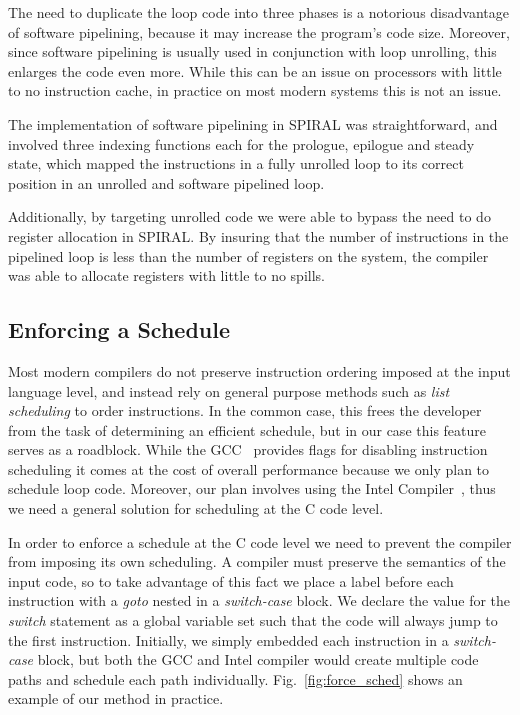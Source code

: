 \documentclass[10pt]{article}
\begin{document}
The need to duplicate the loop code into three phases is a notorious disadvantage of software
pipelining, because it may increase the program's code size. Moreover, since software pipelining
is usually used in conjunction with loop unrolling, this enlarges the code
even more. While this can be an issue on processors with little to no
instruction cache, in practice on most modern systems this is not an issue.

The implementation of software pipelining in SPIRAL was straightforward, and
involved three indexing functions each for the prologue, epilogue and steady
state, which mapped the instructions in a fully unrolled loop to its correct
position in an unrolled and software pipelined loop.

Additionally, by targeting unrolled code we were able to bypass the need to do
register allocation in SPIRAL. By insuring that the number of instructions in the
pipelined loop is less than the number of registers on the system, the
compiler was able to allocate registers with little to no spills.


\subsection{Enforcing a Schedule}

Most modern compilers do not preserve instruction ordering imposed at the
input language level, and instead rely on general purpose methods such
as \emph{list scheduling} to order instructions. In the common case, this frees
the developer from the task of determining an efficient schedule, but in our
case this feature serves as a roadblock. While the GCC~\cite{gccwebsite} provides flags for
disabling instruction scheduling it comes at the cost of overall
performance because we only plan to schedule loop code. Moreover, our plan
involves using the Intel Compiler~\cite{iccwebsite}, thus we need a general solution for
scheduling at the C code level.

In order to enforce a schedule at the C code level we need to prevent the
compiler from imposing its own scheduling. A compiler must preserve the
semantics of the input code, so to take advantage of this fact we place a
label before each instruction with a \emph{goto} nested in
a \emph{switch-case} block. We declare the value for the \emph{switch}
statement as a global variable set such that the code will always jump to the
first instruction. Initially, we simply embedded each instruction in
a \emph{switch-case} block, but both the GCC and Intel compiler would create
multiple code paths and schedule each path individually. Fig.~\ref{fig:force_sched} shows
an example of our method in practice.
\end{document}
